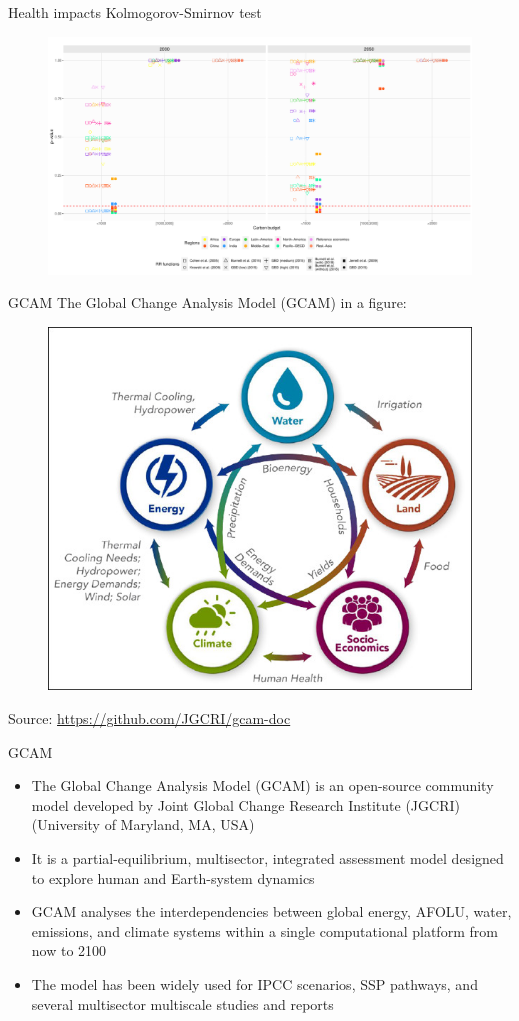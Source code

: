 \begin{frame}{Health impacts Kolmogorov-Smirnov test}
\begin{figure}
    \centering
    \includegraphics[width = 0.98\linewidth]{extraFigs/ks_mort_2030_2050.pdf}
\end{figure}
\vfill \hfill \tiny{\cite{rodes-bachs_beyond_ap}}
\end{frame}



\begin{frame}{GCAM}
    The Global Change Analysis Model (GCAM) in a figure:
\begin{figure}
    \centering
    \includegraphics[width = 0.5\linewidth]{extraFigs/GCAM_diagram_basic.jpg}
\end{figure}
\vfill\hfill \tiny{Source: \url{https://github.com/JGCRI/gcam-doc}}
\end{frame}

\begin{frame}{GCAM}
\begin{itemize}  \setlength\itemsep{5pt}
    \item The Global Change Analysis Model (GCAM) is an open-source community model developed by Joint Global Change Research Institute (JGCRI) (University of Maryland, MA, USA)
    \item It is a partial-equilibrium, multisector, integrated assessment model designed to explore human and Earth-system dynamics
    \item GCAM analyses the interdependencies between global energy, AFOLU, water, emissions, and climate systems within a single computational platform from now to 2100
    \item The model has been widely used for IPCC scenarios, SSP pathways, and several multisector multiscale studies and reports
\end{itemize}
\end{frame}

